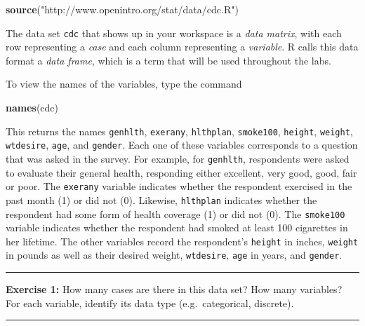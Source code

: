 \documentclass[]{book}
\newenvironment{Shaded}{\begin{snugshade}}{\end{snugshade}}
\newcommand{\KeywordTok}[1]{\textcolor[rgb]{0.13,0.29,0.53}{\textbf{#1}}}
\newcommand{\StringTok}[1]{\textcolor[rgb]{0.31,0.60,0.02}{#1}}
\newcommand{\NormalTok}[1]{#1}
\theoremstyle{definition}
\theoremstyle{definition}
\theoremstyle{definition}
\theoremstyle{remark}
\begin{document}
\begin{Shaded}
\begin{Highlighting}[]
\KeywordTok{source}\NormalTok{(}\StringTok{"http://www.openintro.org/stat/data/cdc.R"}\NormalTok{)}
\end{Highlighting}
\end{Shaded}

The data set \texttt{cdc} that shows up in your workspace is a
\emph{data matrix}, with each row representing a \emph{case} and each
column representing a \emph{variable}. R calls this data format a
\emph{data frame}, which is a term that will be used throughout the
labs.

To view the names of the variables, type the command

\begin{Shaded}
\begin{Highlighting}[]
\KeywordTok{names}\NormalTok{(cdc)}
\end{Highlighting}
\end{Shaded}

This returns the names \texttt{genhlth}, \texttt{exerany},
\texttt{hlthplan}, \texttt{smoke100}, \texttt{height}, \texttt{weight},
\texttt{wtdesire}, \texttt{age}, and \texttt{gender}. Each one of these
variables corresponds to a question that was asked in the survey. For
example, for \texttt{genhlth}, respondents were asked to evaluate their
general health, responding either excellent, very good, good, fair or
poor. The \texttt{exerany} variable indicates whether the respondent
exercised in the past month (1) or did not (0). Likewise,
\texttt{hlthplan} indicates whether the respondent had some form of
health coverage (1) or did not (0). The \texttt{smoke100} variable
indicates whether the respondent had smoked at least 100 cigarettes in
her lifetime. The other variables record the respondent's
\texttt{height} in inches, \texttt{weight} in pounds as well as their
desired weight, \texttt{wtdesire}, \texttt{age} in years, and
\texttt{gender}.

\begin{center}\rule{0.5\linewidth}{\linethickness}\end{center}

\textbf{Exercise 1:} How many cases are there in this data set? How many
variables? For each variable, identify its data type (e.g.~categorical,
discrete).

\begin{center}\rule{0.5\linewidth}{\linethickness}\end{center}
\end{document}
